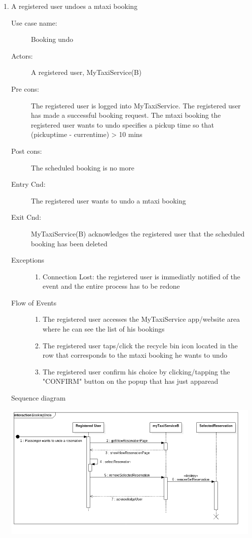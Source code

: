 \documentclass[11pt]{article} %
\begin{document}
\begin{enumerate}
	
	       \item A registered user undoes a mtaxi booking
		\begin{description}
		        \item [Use case name:] Booking undo
		        \item [Actors:] A registered user, MyTaxiService(B)
		        \item [Pre cons:] The registered user is logged into MyTaxiService. The registered user
		        has made a successful booking request. The mtaxi booking the registered user wants to undo
		        specifies a pickup time so that (pickuptime - currentime) > 10 mins
		        \item [Post cons:] The scheduled booking is no more
		        \item [Entry Cnd:] The registered user wants to undo a mtaxi booking
		        \item [Exit Cnd:] MyTaxiService(B) acknowledges the registered user that the scheduled booking
		        has been deleted
		        \item [Exceptions]\hfill
			\begin{enumerate}
			          \item Connection Lost: the registered user is immediatly notified of the event and the entire process
			          has to be redone
			\end{enumerate}
		        \item [Flow of Events]\hfill
			\begin{enumerate}
			          \item The registered user accesses the MyTaxiService app/website area where he can see the list of his bookings
			          \item The registered user taps/click the recycle bin icon located in the row that corresponds to the mtaxi booking
			          he wants to undo
			          \item The registered user confirm his choice by clicking/tapping the "CONFIRM" button on
			          the popup that has just apparead
			\end{enumerate}
		\end{description}
		Sequence diagram
		\begin{center}
		\includegraphics[scale=0.52]{usecase9.png}
		\end{center}
	

\end{enumerate}
\end{document}
